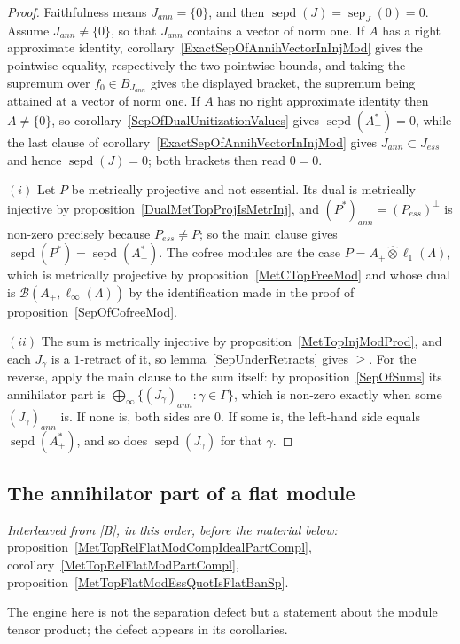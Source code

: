 \documentclass[11pt]{article}
\theoremstyle{plain}
\theoremstyle{definition}
\newcommand{\projtens}{\mathbin{\widehat{\otimes}}}
\DeclareMathOperator{\sep}{sep}
\DeclareMathOperator{\sepd}{sepd}
\begin{document}
\begin{proof}
Faithfulness means $J_{ann}= \{0 \}$, and then $\sepd(J)=\sep_J(0)=0$. Assume
$J_{ann}\neq \{0 \}$, so that $J_{ann}$ contains a vector of norm one. If $A$ has
a right approximate identity, corollary~\ref{ExactSepOfAnnihVectorInInjMod} gives
the pointwise equality, respectively the two pointwise bounds, and taking the
supremum over $f_0\in B_{J_{ann}}$ gives the displayed bracket, the supremum
being attained at a vector of norm one. If $A$ has no right approximate identity
then $A\neq \{0 \}$, so corollary~\ref{SepOfDualUnitizationValues} gives
$\sepd(A_+^*)=0$, while the last clause of
corollary~\ref{ExactSepOfAnnihVectorInInjMod} gives $J_{ann}\subset J_{ess}$ and
hence $\sepd(J)=0$; both brackets then read $0=0$.

$(i)$ Let $P$ be metrically projective and not essential. Its dual is metrically
injective by proposition~\ref{DualMetTopProjIsMetrInj}, and
${(P^*)}_{ann}={(P_{ess})}^\perp$ is non-zero precisely because
$P_{ess}\neq P$; so the main clause gives $\sepd(P^*)=\sepd(A_+^*)$. The cofree
modules are the case $P=A_+\projtens\ell_1(\Lambda)$, which is metrically
projective by proposition~\ref{MetCTopFreeMod} and whose dual is
$\mathcal{B}(A_+,\ell_\infty(\Lambda))$ by the identification made in the proof
of proposition~\ref{SepOfCofreeMod}.

$(ii)$ The sum is metrically injective by
proposition~\ref{MetTopInjModProd}, and each $J_\gamma$ is a $1$-retract of it,
so lemma~\ref{SepUnderRetracts} gives $\geq$. For the reverse, apply the main
clause to the sum itself: by proposition~\ref{SepOfSums} its annihilator part is
$\bigoplus_\infty \{{(J_\gamma)}_{ann}:\gamma\in\Gamma \}$, which is non-zero
exactly when some ${(J_\gamma)}_{ann}$ is. If none is, both sides are $0$. If
some is, the left-hand side equals $\sepd(A_+^*)$, and so does $\sepd(J_\gamma)$
for that $\gamma$.
\end{proof}

\subsection{The annihilator part of a flat module}\label{SubSectionAnnihPartOfFlatMod}

\emph{Interleaved from [B], in this order, before the material below:}
proposition~\ref{MetTopRelFlatModCompIdealPartCompl},
corollary~\ref{MetTopRelFlatModPartCompl},
proposition~\ref{MetTopFlatModEssQuotIsFlatBanSp}.

The engine here is not the separation defect but a statement about the module
tensor product; the defect appears in its corollaries.
\end{document}
